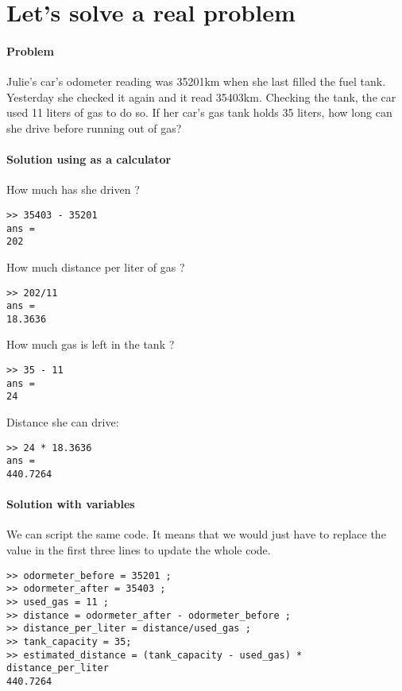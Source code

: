 \section{Let's solve a real problem}

\paragraph*{Problem}
Julie's car's odometer reading was 35201km when she last filled the fuel tank. 
Yesterday she checked it again and it read 35403km. Checking the tank, the car used 11 liters of gas to do so.
If her car's gas tank holds 35 liters, how long can she drive before running out of gas? 


\paragraph*{Solution using \matlab as a calculator}

How much has she driven ?
\begin{lstlisting}
>> 35403 - 35201
ans =
202
\end{lstlisting}

How much distance per liter of gas ?
\begin{lstlisting}
>> 202/11
ans =
18.3636
\end{lstlisting}

How much gas is left in the tank ?
\begin{lstlisting}
>> 35 - 11
ans =
24
\end{lstlisting}

Distance she can drive:
\begin{lstlisting}
>> 24 * 18.3636
ans =
440.7264
\end{lstlisting}


\paragraph*{Solution with variables}

We can script the same code. It means that we would just have to replace the value in the first three lines to update the whole code. 


\begin{lstlisting}
>> odormeter_before = 35201 ;
>> odormeter_after = 35403 ; 
>> used_gas = 11 ;
>> distance = odormeter_after - odormeter_before ;  
>> distance_per_liter = distance/used_gas ;
>> tank_capacity = 35;
>> estimated_distance = (tank_capacity - used_gas) * distance_per_liter
440.7264
\end{lstlisting}


